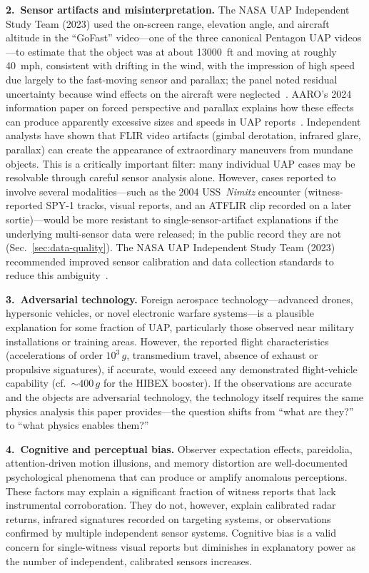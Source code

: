 \documentclass[aps,prd,twocolumn,superscriptaddress,nofootinbib,floatfix]{revtex4-2}
\begin{document}
\textbf{2.\ Sensor artifacts and misinterpretation.} The NASA UAP Independent
Study Team (2023) used the on-screen range, elevation angle, and aircraft altitude
in the ``GoFast'' video---one of the three canonical Pentagon UAP videos---to
estimate that the object was at about \SI{13000}{ft} and moving at roughly
\SI{40}{mph}, consistent with drifting in the wind, with the impression of high
speed due largely to the fast-moving sensor and parallax; the panel noted residual
uncertainty because wind effects on the aircraft were
neglected~\cite{NASA_UAP2023}. AARO's 2024 information paper on forced perspective
and parallax explains how these effects can produce apparently excessive sizes and
speeds in UAP reports~\cite{AARO_Parallax2024}. Independent analysts have shown
that FLIR video artifacts (gimbal derotation, infrared glare, parallax) can create
the appearance of extraordinary maneuvers from mundane objects. This is a
critically important filter: many individual UAP cases may be resolvable through
careful sensor analysis alone. However, cases reported to involve several
modalities---such as the 2004 USS~\textit{Nimitz} encounter (witness-reported
SPY-1 tracks, visual reports, and an ATFLIR clip recorded on a later
sortie)---would be more resistant to single-sensor-artifact explanations if the
underlying multi-sensor data were released; in the public record they are not
(Sec.~\ref{sec:data-quality}). The NASA UAP Independent Study Team (2023)
recommended improved sensor calibration and data collection standards to reduce
this ambiguity~\cite{NASA_UAP2023}.

\textbf{3.\ Adversarial technology.} Foreign aerospace technology---advanced
drones, hypersonic vehicles, or novel electronic warfare systems---is a plausible
explanation for some fraction of UAP, particularly those observed near military
installations or training areas. However, the reported flight characteristics
(accelerations of order $10^{3}\,g$, transmedium travel, absence of exhaust or
propulsive signatures), if accurate, would exceed any demonstrated flight-vehicle
capability (cf.\ ${\sim}400\,g$ for the HIBEX booster). If the observations are
accurate and the objects are adversarial technology, the technology itself
requires the same physics analysis this paper provides---the question shifts from
``what are they?'' to ``what physics enables them?''

\textbf{4.\ Cognitive and perceptual bias.} Observer expectation effects,
pareidolia, attention-driven motion illusions, and memory distortion are
well-documented psychological phenomena that can produce or amplify anomalous
perceptions. These factors may explain a significant fraction of witness reports
that lack instrumental corroboration. They do not, however, explain calibrated
radar returns, infrared signatures recorded on targeting systems, or observations
confirmed by multiple independent sensor systems. Cognitive bias is a valid concern
for single-witness visual reports but diminishes in explanatory power as the
number of independent, calibrated sensors increases.
\end{document}

